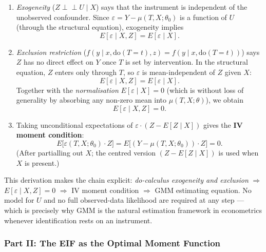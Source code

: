 \documentclass[12pt]{article}
\newcommand{\indep}{\perp\!\!\!\perp}
\begin{document}
\begin{itemize}
    \begin{enumerate}
      \item \emph{Exogeneity} ($Z \indep U \mid X$) says that the
        instrument is independent of the unobserved confounder.
        Since $\varepsilon = Y - \mu(T,X;\theta_0)$ is a function of
        $U$ (through the structural equation), exogeneity implies
        \[
          E[\varepsilon \mid X, Z] = E[\varepsilon \mid X].
        \]

      \item \emph{Exclusion restriction}
        ($f(y \mid x, \mathrm{do}(T{=}t), z)
         = f(y \mid x, \mathrm{do}(T{=}t))$)
        says $Z$ has no direct effect on $Y$ once $T$ is set by
        intervention.  In the structural equation, $Z$ enters only
        through $T$, so $\varepsilon$ is mean-independent of $Z$
        given $X$:
        \[
          E[\varepsilon \mid X, Z] = E[\varepsilon \mid X].
        \]
        Together with the \emph{normalisation}
        $E[\varepsilon \mid X] = 0$ (which is without loss of
        generality by absorbing any non-zero mean into
        $\mu(T,X;\theta)$), we obtain
        \[
          E[\varepsilon \mid X, Z] = 0.
        \]

      \item Taking unconditional expectations of
        $\varepsilon \cdot (Z - E[Z \mid X])$ gives the
        \textbf{IV moment condition}:
        \[
          \boxed{E\!\bigl[\varepsilon(T, X;\theta_0) \cdot Z\bigr]
          = E\!\bigl[(Y - \mu(T, X;\theta_0))\cdot Z\bigr] = 0.}
        \]
        (After partialling out $X$; the centred version
        $(Z - E[Z\mid X])$ is used when $X$ is present.)
    \end{enumerate}

    This derivation makes the chain explicit:
    \emph{do-calculus exogeneity and exclusion}
    $\Rightarrow$ $E[\varepsilon \mid X, Z] = 0$
    $\Rightarrow$ IV moment condition
    $\Rightarrow$ GMM estimating equation.
    No model for $U$ and no full observed-data likelihood are required
    at any step --- which is precisely why GMM is the natural
    estimation framework in econometrics whenever identification rests
    on an instrument.
\end{itemize}

\subsubsection*{Part II: The EIF as the Optimal Moment Function}
\end{document}
